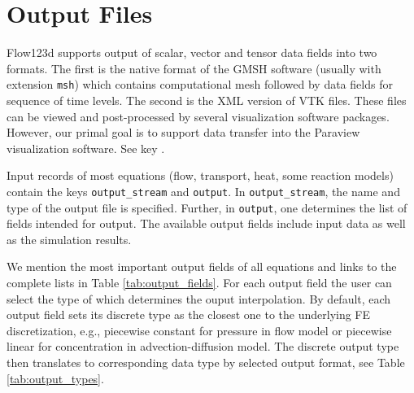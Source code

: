 %
%
%
%

\section{Output Files}
\label{section_output}

Flow123d supports output of scalar, vector and tensor data fields into two formats. The first is the native format of the GMSH software (usually with extension \verb'msh')
which contains computational mesh followed by data fields for sequence of time levels. The second is the XML version of VTK files. These files can be 
viewed and post-processed by several visualization software packages. However, our primal goal is to support data transfer into the Paraview visualization software.
See key .

Input records of most equations (flow, transport, heat, some reaction models) contain the keys {\tt output\_stream} and {\tt output}.
In {\tt output\_stream}, the name and type of the output file is specified.
Further, in {\tt output}, one determines the list of fields intended for output.
The available output fields include input data as well as the simulation results.

We mention the most important output fields of all equations and links to the complete lists in Table \ref{tab:output_fields}.
For each output field the user can select the type of  which determines the ouput interpolation. By default, each output field sets its discrete type as the closest one to the underlying FE discretization, e.g., piecewise constant for pressure in flow model or piecewise linear for concentration in advection-diffusion model.
The discrete output type then translates to corresponding data type by selected output format, see Table \ref{tab:output_types}.

